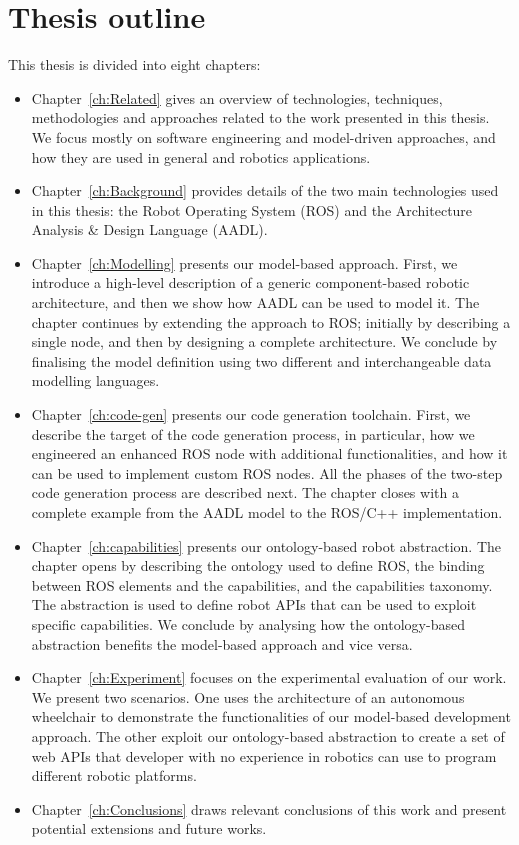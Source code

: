 \section{Thesis outline}
This thesis is divided into eight chapters:
\begin{itemize}
\item Chapter~\ref{ch:Related} gives an overview of technologies, techniques, methodologies and approaches related to the work presented in this thesis.  We focus mostly on software engineering and model-driven approaches, and how they are used in general and robotics applications.
\item Chapter~\ref{ch:Background} provides details of the two main technologies used in this thesis: the Robot Operating System (ROS) and the Architecture Analysis \& Design Language (AADL).
\item Chapter~\ref{ch:Modelling} presents our model-based approach. First, we introduce a high-level description of a generic component-based robotic architecture, and then we show how AADL can be used to model it. The chapter continues by extending the approach to ROS; initially by describing a single node, and then by designing a complete architecture. We conclude by finalising the model definition using two different and interchangeable data modelling languages.
\item Chapter~\ref{ch:code-gen} presents our code generation toolchain. First, we describe the target of the code generation process, in particular, how we engineered an enhanced ROS node with additional functionalities, and how it can be used to implement custom ROS nodes. All the phases of the two-step code generation process are described next. The chapter closes with a complete example from the AADL model to the ROS/C++ implementation.
\item Chapter~\ref{ch:capabilities} presents our ontology-based robot abstraction. The chapter opens by describing the ontology used to define ROS, the binding between ROS elements and the capabilities, and the capabilities taxonomy. The abstraction is used to define robot APIs that can be used to exploit specific capabilities. We conclude by analysing how the ontology-based abstraction benefits the model-based approach and vice versa.
\item Chapter~\ref{ch:Experiment} focuses on the experimental evaluation of our work. We present two scenarios. One uses the architecture of an autonomous wheelchair to demonstrate the functionalities of our model-based development approach. The other exploit our ontology-based abstraction to create a set of web APIs that developer with no experience in robotics can use to program different robotic platforms.
\item Chapter~\ref{ch:Conclusions} draws relevant conclusions of this work and present potential extensions and future works.
\end{itemize}

